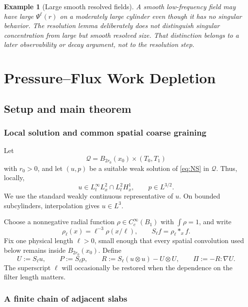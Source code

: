 \documentclass[10pt,a4paper]{amsart}
\numberwithin{equation}{section}
\newtheorem{example}[theorem]{Example}
\begin{document}
\begin{example}[Large smooth resolved fields]
A smooth low-frequency field may have large $\Psi^\ell(r)$ on a moderately large cylinder even though it has no singular behavior.  The resolution lemma deliberately does not distinguish singular concentration from large but smooth resolved size.  That distinction belongs to a later observability or decay argument, not to the resolution step.
\end{example}
\section{Pressure--Flux Work Depletion}\label{sec:work-depletion}

\subsection{Setup and main theorem}\label{sec:setup}

\subsubsection{Local solution and common spatial coarse graining}

Let
\[
\mathcal Q=B_{2r_0}(x_0)\times(T_0,T_1)
\]
with \(r_0>0\), and let \((u,p)\) be a suitable weak solution of \eqref{eq:NS} in \(\mathcal Q\). Thus, locally,
\begin{equation}\label{eq:energy-class}
u\in L^\infty_tL^2_x\cap L^2_tH^1_x,
\qquad
p\in L^{3/2}.
\end{equation}
We use the standard weakly continuous representative of \(u\). On bounded subcylinders, interpolation gives \(u\in L^3\).

Choose a nonnegative radial function \(\rho\in C_c^\infty(B_1)\) with \(\int\rho=1\), and write
\[
\rho_\ell(x)=\ell^{-3}\rho(x/\ell),
\qquad
S_\ell f=\rho_\ell*_x f.
\]
Fix one physical length \(\ell>0\), small enough that every spatial convolution used below remains inside \(B_{2r_0}(x_0)\). Define
\begin{equation}\label{eq:coarse-package}
U:=S_\ell u,
\qquad
P:=S_\ell p,
\qquad
R:=S_\ell(u\otimes u)-U\otimes U,
\qquad
\Pi:=-R:\nabla U.
\end{equation}
The superscript \(\ell\) will occasionally be restored when the dependence on the filter length matters.

\subsubsection{A finite chain of adjacent slabs}
\end{document}
